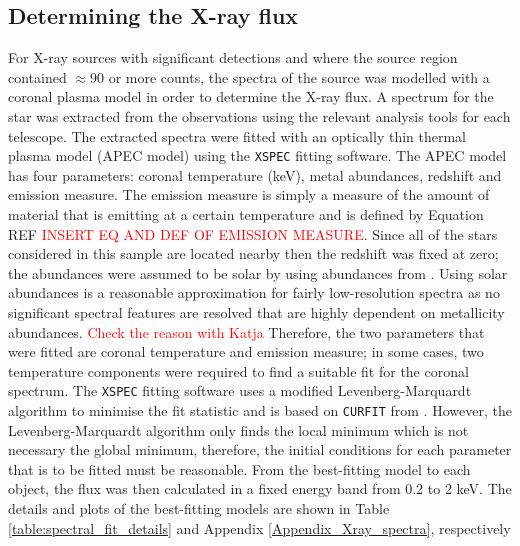 \subsection{Determining the X-ray flux}
\label{Section_Determining_Xray_flux}
For X-ray sources with significant detections and where the source region contained $\approx 90$ or more counts, the spectra of the source was modelled with a coronal plasma model in order to determine the X-ray flux. A spectrum for the star was extracted from the observations using the relevant analysis tools for each telescope. The extracted spectra were fitted with an optically thin thermal plasma model (APEC model) using the \texttt{XSPEC} fitting software. The APEC model has four parameters: coronal temperature (keV), metal abundances, redshift and emission measure. The emission measure is simply a measure of the amount of material that is emitting at a certain temperature and is defined by Equation REF \textcolor{red}{INSERT EQ AND DEF OF EMISSION MEASURE}. Since all of the stars considered in this sample are located nearby then the redshift was fixed at zero; the abundances were assumed to be solar by using abundances from \citet{Grevesse_Sauval_1998}. Using solar abundances is a reasonable approximation for fairly low-resolution spectra as no significant spectral features are resolved that are highly dependent on metallicity abundances. \textcolor{red}{Check the reason with Katja}
Therefore, the two parameters that were fitted are coronal temperature and emission measure; in some cases, two temperature components were required to find a suitable fit for the coronal spectrum. The \texttt{XSPEC} fitting software uses a modified Levenberg-Marquardt algorithm to minimise the fit statistic and is based on \texttt{CURFIT} from \citet{Bevington_1969}. However, the Levenberg-Marquardt algorithm only finds the local minimum which is not necessary the global minimum, therefore, the initial conditions for each parameter that is to be fitted must be reasonable. From the best-fitting model to each object, the flux was then calculated in a fixed energy band from 0.2 to 2 keV. The details and plots of the best-fitting models are shown in Table \ref{table:spectral_fit_details} and Appendix \ref{Appendix_Xray_spectra}, respectively

